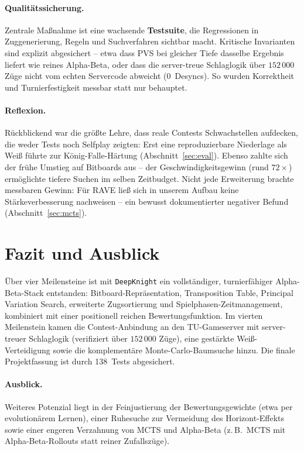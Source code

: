 \documentclass[11pt,a4paper]{article}
\newcommand{\code}[1]{\texttt{\small #1}}
\begin{document}
\paragraph{Qualit\"atssicherung.}
Zentrale Ma\ss nahme ist eine wachsende \textbf{Testsuite},
die Regressionen in Zuggenerierung, Regeln und Suchverfahren sichtbar macht.
Kritische Invarianten sind explizit abgesichert -- etwa dass PVS bei gleicher
Tiefe dasselbe Ergebnis liefert wie reines Alpha-Beta, oder dass die
server-treue Schlaglogik \"uber $152\,000$ Z\"uge nicht vom echten Servercode
abweicht (0~Desyncs).
So wurden Korrektheit und Turnierfestigkeit messbar statt nur behauptet.

\paragraph{Reflexion.}
R\"uckblickend war die gr\"o\ss te Lehre, dass reale Contests Schwachstellen
aufdecken, die weder Tests noch Selfplay zeigten: Erst eine reproduzierbare
Niederlage als Wei\ss{} f\"uhrte zur \glqq K\"onig-Falle\grqq{}-H\"artung
(Abschnitt~\ref{sec:eval}).
Ebenso zahlte sich der fr\"uhe Umstieg auf Bitboards aus -- der Geschwindigkeits\-gewinn
(rund $72\times$) erm\"oglichte tiefere Suchen im selben Zeitbudget.
Nicht jede Erweiterung brachte messbaren Gewinn: F\"ur RAVE lie\ss{} sich in
unserem Aufbau keine St\"arkeverbesserung nachweisen -- ein bewusst dokumentierter
negativer Befund (Abschnitt~\ref{sec:mcts}).

\section{Fazit und Ausblick}\label{sec:conclusion}
\"Uber vier Meilensteine ist mit \code{DeepKnight} ein vollst\"andiger,
turnierf\"ahiger Alpha-Beta-Stack entstanden: Bitboard-Repr\"asentation,
Transposition Table, Principal Variation Search, erweiterte Zugsortierung und
Spielphasen-Zeitmanagement, kombiniert mit einer positionell reichen
Bewertungsfunktion.
Im vierten Meilenstein kamen die Contest-Anbindung an den TU-Gameserver mit
server-treuer Schlaglogik (verifiziert \"uber $152\,000$ Z\"uge), eine gest\"arkte
Wei\ss-Verteidigung sowie die komplement\"are Monte-Carlo-Baumsuche hinzu.
Die finale Projektfassung ist durch 138~Tests abgesichert.

\paragraph{Ausblick.}
Weiteres Potenzial liegt in der Feinjustierung der Bewertungsgewichte (etwa per
evolution\"arem Lernen), einer Ruhesuche zur Vermeidung des Horizont-Effekts
sowie einer engeren Verzahnung von MCTS und Alpha-Beta (z.\,B.\ MCTS mit
Alpha-Beta-Rollouts statt reiner Zufallsz\"uge).
\end{document}
